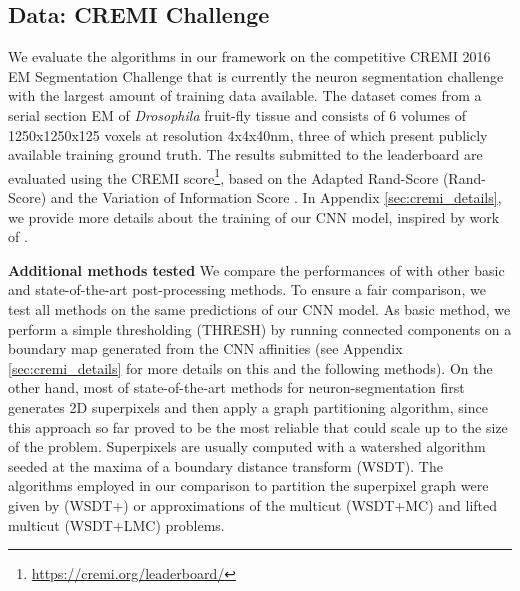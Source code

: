 

\subsection{Data: CREMI Challenge} \label{sec:cremi_challenge}
We evaluate the algorithms in our framework on the competitive CREMI 2016 EM Segmentation Challenge \cite{cremiChallenge} that is currently the neuron segmentation challenge with the largest amount of training data available. The dataset comes from a serial section EM of \emph{Drosophila} fruit-fly tissue and consists of 6 volumes of 1250x1250x125 voxels at resolution 4x4x40nm, three of which present publicly available training ground truth. The results submitted to the leaderboard are evaluated using the CREMI score\footnote{\url{https://cremi.org/leaderboard/}}, based on the Adapted Rand-Score (Rand-Score) and the Variation of Information Score \cite{arganda2015crowdsourcing}. In Appendix \ref{sec:cremi_details}, we provide more details about the training of our CNN model, inspired by work of \cite{lee2017superhuman,funke2018large}.


\textbf{Additional methods tested } We compare the performances of \algname{} with other basic and state-of-the-art post-processing methods. To ensure a fair comparison, we test all methods on the same predictions of our CNN model. As basic method, we perform a simple thresholding (THRESH) by running connected components on a boundary map generated from the CNN affinities (see Appendix \ref{sec:cremi_details} for more details on this and the following methods). On the other hand, most of state-of-the-art methods for neuron-segmentation first generates 2D superpixels and then apply a graph partitioning algorithm, since this approach so far proved to be the most reliable that could scale up to the size of the problem. Superpixels are usually computed with a watershed algorithm seeded at the maxima of a boundary distance transform (WSDT). The algorithms employed in our comparison to partition the superpixel graph were given by \algname{} (WSDT+\algname{}) or approximations of the multicut (WSDT+MC) and lifted multicut (WSDT+LMC) problems.


